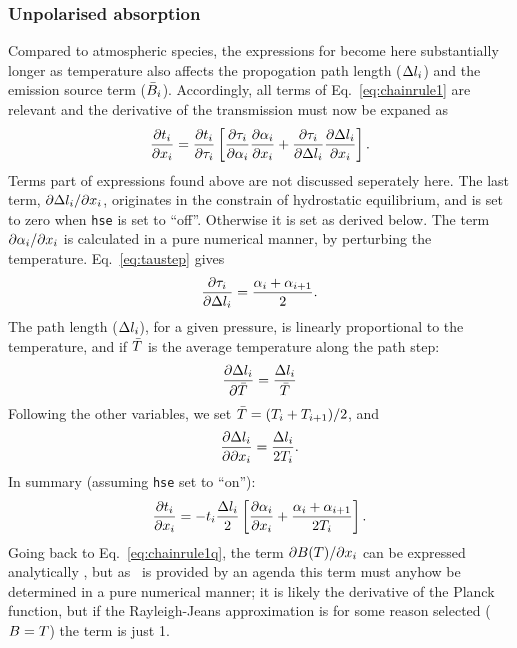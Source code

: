 \subsubsection{Unpolarised absorption}
%
Compared to atmospheric species, the expressions for become here substantially
longer as temperature also affects the propogation path length ($\Delta
l_{i}$) and the emission source term ($\bar{B}_i$). Accordingly,
all terms of Eq.~\ref{eq:chainrule1} are relevant and the derivative of the
transmission must now be expaned as
\begin{equation}
  \frac{\partial t_{i}}{\partial x_{i}} =
    \frac{\partial t_{i}}{\partial\tau_{i}}
    \left[
      \frac{\partial\tau_{i}}{\partial{\alpha}_{i}}
      \frac{\partial{\alpha}_{i}}{\partial x_{i}} + 
      \frac{\partial\tau_{i}}{\partial\Delta l_{i}}
     \frac{\partial\Delta l_{i}}{\partial x_{i}}
    \right].
\end{equation}
Terms part of expressions found above are not discussed seperately here. The
last term, $\partial\Delta l_{i}/\partial x_{i}$, originates in the
constrain of hydrostatic equilibrium, and is set to zero when \verb|hse| 
is set to ``off''. Otherwise it is set as derived below.
The term $\partial{\alpha}_{i}/\partial x_{i}$ is calculated in a pure
numerical manner, by perturbing the temperature. Eq.~\ref{eq:taustep} gives
\begin{equation}
  \frac{\partial \tau_{i}}{\partial \Delta l_{i}} = 
  \frac{{\alpha}_{i}+{\alpha}_{i+1}}{2}. 
\end{equation}
The path length ($\Delta l_{i}$), for a given pressure, is linearly
proportional to the temperature, and if $\bar{T}$ is the average temperature
along the path step:
\begin{equation}
  \frac{\partial \Delta l_{i}}{\partial \bar{T}} =   
                                    \frac{\Delta l_{i}}{\bar{T}} 
\end{equation}
Following the other variables, we set $\bar{T}=(T_{i}+T_{i+1})/2$, and
\begin{equation}
  \frac{\partial \Delta l_{i}}{\partial \partial x_{i}} = 
                                    \frac{\Delta l_{i}}{2T_{i}}.
\end{equation}
In summary (assuming \verb|hse| set to ``on''):
\begin{equation}
  \frac{\partial t_{i}}{\partial x_{i}} = -t_{i}
    \frac{\Delta l_{i}}{2}
    \left[
      \frac{\partial{\alpha}_{i}}{\partial x_{i}} + 
      \frac{{\alpha}_{i}+{\alpha}_{i+1}}{2T_{i}}
    \right].  
\end{equation}
Going back to Eq.~\ref{eq:chainrule1q}, the term
$\partial B(T)/\partial x_{i}$ can be expressed analytically
\citep{eriksson:studi:02}, but as \Planck\ is provided by an agenda this term
must anyhow be determined in a pure numerical manner; it is likely the
derivative of the Planck function, but if the Rayleigh-Jeans approximation is
for some reason selected ($B=T$) the term is just 1.

